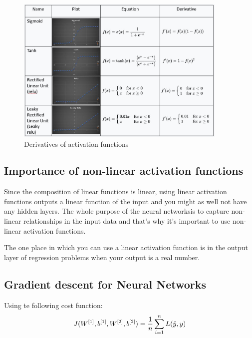     \begin{figure}[H]
        \begin{center}
                \includegraphics[width=0.9\textwidth]{img/derivatives.jpg}
                \caption{Derivatives of activation functions}
            \end{center}
    \end{figure}

\subsection*{Importance of non-linear activation functions}

    Since the composition of linear functions is linear, using linear activation functions outputs
    a linear function of the input and you might as well not have any hidden layers. 
    The whole purpose of the neural networksis to capture non-linear relationships in the 
    input data and that's why it's important to use non-linear activation functions.

    The one place in which you can use a linear activation function is in the output layer of 
    regression problems when your output is a real number.

\subsection*{Gradient descent for Neural Networks}

    Using te following cost function:
    \begin{align*}
        J(W^{[1]},b^{[1]},W^{[2]},b^{[2]}) = \frac{1}{n} \sum_{i=1}^n L(\Hat{y},y)
    \end{align*}

